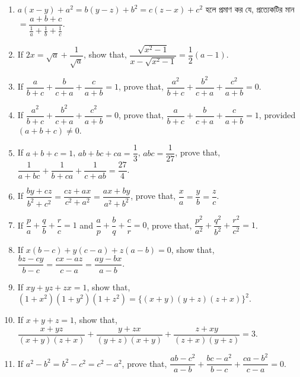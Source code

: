 \documentclass[11pt, a4paper]{article}
\begin{document}
\begin{enumerate}
	\item $a\left(x - y\right) + a^2 = b\left(y - z\right) + b^2 = c\left(z - x\right) + c^2$ \textbengali{হলে প্রমাণ কর যে, প্রত্যেকটির মান} $= \dfrac{a+b+c}{\frac{1}{a} + \frac{1}{b} + \frac{1}{c}}$.
	
	\item If $2x = \sqrt{a} + \dfrac{1}{\sqrt{a}}$, show that, $\dfrac{\sqrt{x^2 - 1}}{x - \sqrt{x^2 - 1}} = \dfrac{1}{2} \left(a-1\right)$.
	
	\item If $\dfrac{a}{b+c} + \dfrac{b}{c+a} + \dfrac{c}{a+b} = 1$, prove that, $\dfrac{a^2}{b+c} + \dfrac{b^2}{c+a} + \dfrac{c^2}{a+b} = 0$.
	
	\item If $\dfrac{a^2}{b+c} + \dfrac{b^2}{c+a} + \dfrac{c^2}{a+b} = 0$, prove that, $\dfrac{a}{b+c} + \dfrac{b}{c+a} + \dfrac{c}{a+b} = 1$, provided $\left( a+b+c \right) \neq 0$.

	\item If $a+b+c = 1$, $ab+bc+ca = \dfrac{1}{3}$, $abc = \dfrac{1}{27}$, prove that, $\dfrac{1}{a+bc} + \dfrac{1}{b+ca} + \dfrac{1}{c+ab} = \dfrac{27}{4}$.
	
	\item If $\dfrac{by+cz}{b^2 + c^2} = \dfrac{cz+ax}{c^2+a^2} = \dfrac{ax+by}{a^2+b^2}$, prove that, $\dfrac{x}{a} = \dfrac{y}{b} = \dfrac{z}{c}$.
	
	\item If $\dfrac{p}{a} + \dfrac{q}{b} + \dfrac{r}{c} = 1$ and $\dfrac{a}{p} + \dfrac{b}{q} + \dfrac{c}{r} = 0$, prove that, $\dfrac{p^2}{a^2} + \dfrac{q^2}{b^2} + \dfrac{r^2}{c^2} = 1$.
	
	\item If $x\left( b-c \right) + y \left( c-a \right) + z\left( a-b \right) = 0$, show that, $\dfrac{bz-cy}{b-c} = \dfrac{cx-az}{c-a} = \dfrac{ay-bx}{a-b}$.
	
	\item If $xy+yz+zx=1$, show that, $\left(1+x^2\right) \left(1+y^2\right)\left(1+z^2\right) = \{ \left(x+y\right)\left(y+z\right)\left(z+x\right) \}^2$.
	
	\item If $x+y+z=1$, show that, $\dfrac{x+yz}{\left(x+y\right)\left(z+x\right)} + \dfrac{y+zx}{\left(y+z\right)\left(x+y\right)} + \dfrac{z+xy}{\left(z+x\right)\left(y+z\right)} = 3$.
	
	\item If $a^2 - b^2 = b^2 - c^2 = c^2 - a^2$, prove that, $\dfrac{ab-c^2}{a-b} + \dfrac{bc-a^2}{b-c} + \dfrac{ca-b^2}{c-a} = 0$.
	

\end{enumerate}
\end{document}
